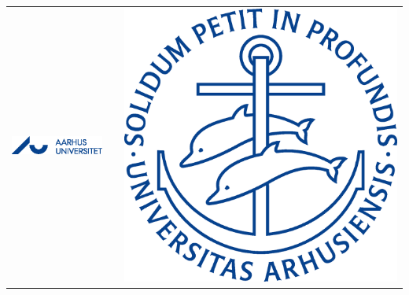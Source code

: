 \documentclass[]{article}
\begin{document}
\maketitle
\vspace{50 mm}
\begin{table}
\centering
\begin{tabular}{cll}
\includegraphics[width = 80 mm]{Images/AU/aulogo_dk_var2_blaa.eps} & \hspace{15 mm} & \includegraphics[width = 30 mm]{Images/AU/ausegl_blaa.eps}
\end{tabular}
\end{table}

\thispagestyle{empty} 
\pagebreak


    \listoffixmes
    
    
    
\end{document}

